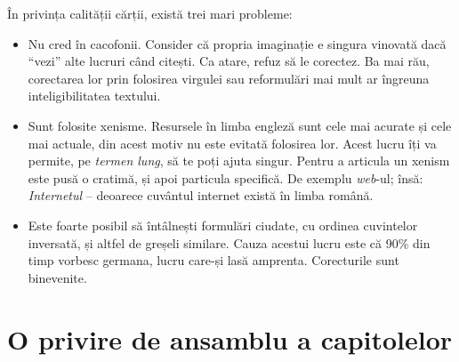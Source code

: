 În privința calității cărții, există trei mari probleme:
\begin{itemize}

\item Nu cred în cacofonii. Consider că propria imaginație e singura vinovată
    dacă ``vezi'' alte lucruri când citești. Ca atare, refuz să le corectez. Ba
    mai rău, corectarea lor prin folosirea virgulei sau reformulări mai mult ar
    îngreuna inteligibilitatea textului.

\item Sunt folosite xenisme. Resursele în limba engleză sunt cele mai acurate și
    cele mai actuale, din acest motiv nu este evitată folosirea lor. Acest lucru
    îți va permite, pe \textit{termen lung}, să te poți ajuta singur. Pentru
    a articula un xenism este pusă o cratimă, și apoi particula specifică. De
    exemplu \textsl{web}-ul; însă: \textit{Internetul} -- deoarece cuvântul
    internet există în limba română.

\item Este foarte posibil să întâlnești formulări ciudate, cu ordinea cuvintelor
    inversată, și altfel de greșeli similare. Cauza acestui lucru este că 90\%
    din timp vorbesc germana, lucru care-și lasă amprenta.  Corecturile sunt
    binevenite.

\end{itemize}

\section*{O privire de ansamblu a capitolelor}
{}

